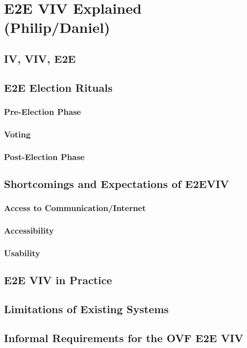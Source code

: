 \chapter{E2E VIV Explained (Philip/Daniel)}
\label{chapter:e2e_viv_explained}

\section{IV, VIV, E2E}
\section{E2E Election Rituals}
\subsection{Pre-Election Phase}
\subsection{Voting}
\subsection{Post-Election Phase}
\section{Shortcomings and Expectations of E2EVIV}
\subsection{Access to Communication/Internet}
\subsection{Accessibility}
\subsection{Usability}
\section{E2E VIV in Practice}
\section{Limitations of Existing Systems}
\section{Informal Requirements for the OVF E2E VIV}
